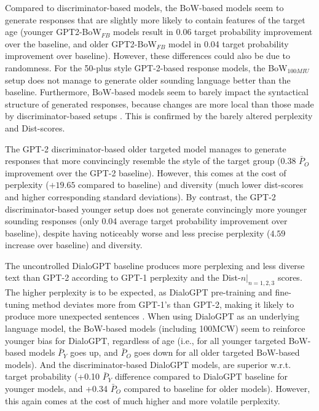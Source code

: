 Compared to discriminator-based models, the BoW-based models seem to generate responses that are slightly more likely to contain features of the target age (younger GPT2-BoW$_{FB}$ models result in 0.06 target probability improvement over the baseline, and older GPT2-BoW$_{FB}$ model in 0.04 target probability improvement over baseline). However, these differences could also be due to randomness. For the 50-plus style GPT-2-based response models, the BoW$_{100MIU}$ setup does not manage to generate older sounding language better than the baseline. Furthermore, BoW-based models seem to barely impact the syntactical structure of generated responses, because changes are more local than those made by discriminator-based setups \cite{dathathri2019plug}. This is confirmed by the barely altered perplexity and Dist-scores. 

The GPT-2 discriminator-based older targeted model manages to generate responses that more convincingly resemble the style of the target group (0.38 $\bar{P}_O$ improvement over the GPT-2 baseline). However, this comes at the cost of perplexity ($+19.65$ compared to baseline) and diversity (much lower dist-scores and higher corresponding standard deviations). By contrast, the GPT-2 discriminator-based younger setup does not generate convincingly more younger sounding responses (only 0.04 average target probability improvement over baseline), despite having noticeably worse and less precise perplexity ($4.59$ increase over baseline) and diversity.

The uncontrolled DialoGPT baseline produces more perplexing and less diverse text than GPT-2 according to GPT-1 perplexity and the Dist-$n |_{n = 1,2,3}$ scores. The higher perplexity is to be expected, as DialoGPT pre-training and fine-tuning method deviates more from GPT-1's than GPT-2, making it likely to produce more unexpected sentences \citep{zhang2019dialogpt}. When using DialoGPT as an underlying language model, the BoW-based models (including 100MCW) seem to reinforce younger bias for DialoGPT, regardless of age (i.e., for all younger targeted BoW-based models $\bar{P}_Y$ goes up, and $\bar{P}_O$ goes down for all older targeted BoW-based models). And the discriminator-based DialoGPT models, are superior w.r.t. target probability (+0.10 $\bar{P}_Y$ difference compared to DialoGPT baseline for younger models, and +0.34 $\bar{P}_O$ compared to baseline for older models). However, this again comes at the cost of much higher and more volatile perplexity.

